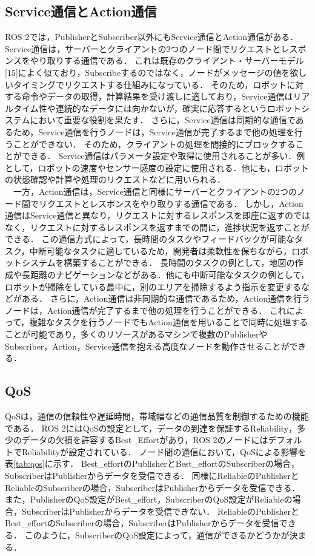 \subsection{Service通信とAction通信}
ROS 2では，PublisherとSubscriber以外にもService通信とAction通信がある．
Service通信は，サーバーとクライアントの2つのノード間でリクエストとレスポンスをやり取りする通信である．
これは既存のクライアント・サーバーモデル[15]によく似ており，Subscribeするのではなく，ノードがメッセージの値を欲しいタイミングでリクエストする仕組みになっている．
そのため，ロボットに対する命令やデータの取得，計算結果を受け渡しに適しており，Service通信はリアルタイム性や連続的なデータには向かないが，確実に応答するというロボットシステムにおいて重要な役割を果たす．
さらに，Service通信は同期的な通信であるため，Service通信を行うノードは，Service通信が完了するまで他の処理を行うことができない．
そのため，クライアントの処理を間接的にブロックすることができる．
Service通信はパラメータ設定や取得に使用されることが多い．例として，ロボットの速度やセンサー感度の設定に使用される．他にも，ロボットの状態確認や計算や処理のリクエストなどに用いられる．
\\　一方，Action通信は，Service通信と同様にサーバーとクライアントの2つのノード間でリクエストとレスポンスをやり取りする通信である．
しかし，Action通信はService通信と異なり，リクエストに対するレスポンスを即座に返すのではなく，リクエストに対するレスポンスを返すまでの間に，進捗状況を返すことができる．
この通信方式によって，長時間のタスクやフィードバックが可能なタスク，中断可能なタスクに適しているため，開発者は柔軟性を保ちながら，ロボットシステムを構築することができる．
長時間のタスクの例として，地図の作成や長距離のナビゲーションなどがある．他にも中断可能なタスクの例として，ロボットが掃除をしている最中に，別のエリアを掃除するよう指示を変更するなどがある．
さらに，Action通信は非同期的な通信であるため，Action通信を行うノードは，Action通信が完了するまで他の処理を行うことができる．
これによって，複雑なタスクを行うノードでもAction通信を用いることで同時に処理することが可能であり，多くのリソースがあるマシンで複数のPublisherやSubscriber，Action，Service通信を抱える高度なノードを動作させることができる．
\subsection{QoS}
 QoSは，通信の信頼性や遅延時間，帯域幅などの通信品質を制御するための機能である．
 ROS 2にはQoSの設定として，データの到達を保証するReliability，多少のデータの欠損を許容するBest\_Effortがあり，ROS 2のノードにはデフォルトでReliabilityが設定されている．
 ノード間の通信において，QoSによる影響を表\ref{tab:qos}に示す．
Best\_effortのPublisherとBest\_effortのSubscriberの場合，SubscriberはPublisherからデータを受信できる．
同様にReliableのPublisherとReliableのSubscriberの場合，SubscriberはPublisherからデータを受信できる．
また，PublisherのQoS設定がBest\_effort，SubscriberのQoS設定がReliableの場合，SubscriberはPublisherからデータを受信できない．
ReliableのPublisherとBest\_effortのSubscriberの場合，SubscriberはPublisherからデータを受信できる．
このように，SubscriberのQoS設定によって，通信ができるかどうかが決まる．
